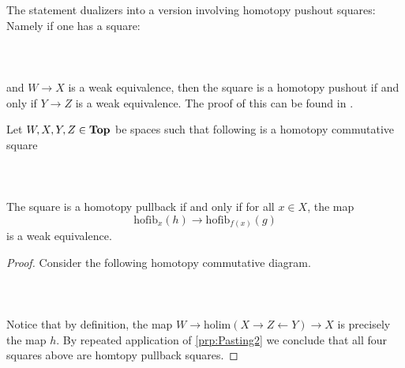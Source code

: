 The statement dualizers into a version involving homotopy pushout squares: Namely if one has a square: 
 \\~\\  \\~\\
and $W\to X$ is a weak equivalence, then the square is a homotopy pushout if and only if $Y\to Z$ is a weak equivalence. The proof of this can be found in \cite{CHT}. 

\begin{prp}\label{prp:Hpull&Hfib} Let $W,X,Y,Z\in\bold{Top}$ be spaces such that following is a homotopy commutative square  
 \\~\\  \\~\\
The square is a homotopy pullback if and only if for all $x\in X$, the map $$\text{hofib}_x(h)\to\text{hofib}_{f(x)}(g)$$ is a weak equivalence. 
\begin{proof}
Consider the following homotopy commutative diagram. 
 \\~\\  \\~\\
Notice that by definition, the map $W\to\text{holim}(X\rightarrow Z\leftarrow Y)\to X$ is precisely the map $h$. By repeated application of \ref{prp:Pasting2} we conclude that all four squares above are homtopy pullback squares. 


\end{proof}
\end{prp}

